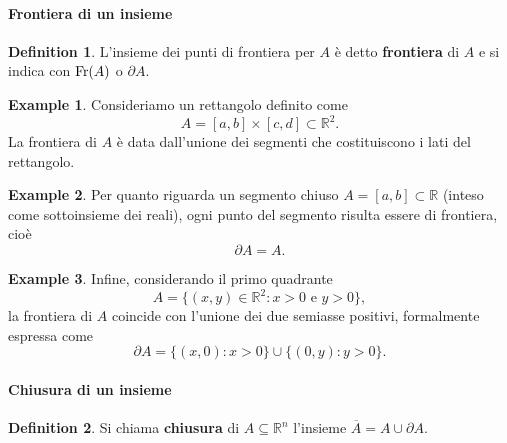 \documentclass{article}
\theoremstyle{plain}
\theoremstyle{definition}
\newtheorem{defn}{Definition}[section]
\newtheorem{exmp}{Example}[section]
\theoremstyle{remark}
\begin{document}
\paragraph{Frontiera di un insieme}
\begin{bxthm}
\begin{defn}
    L'insieme dei punti di frontiera per $A$ è detto \textbf{frontiera} di $A$ e si indica con $\textup{Fr}(A)$ o $\partial A$.
\end{defn}
\end{bxthm}

\vspace{10pt}

\begin{exmp}
    Consideriamo un rettangolo definito come
    \[
    A = [a,b] \times [c,d] \subset \mathbb{R}^2.
    \]
    La frontiera di \( A \) è data dall'unione dei segmenti che costituiscono i lati del rettangolo.
\end{exmp}

\vspace{10pt}

\begin{exmp}
    Per quanto riguarda un segmento chiuso \( A = [a,b] \subset \mathbb{R} \) (inteso come sottoinsieme dei reali), ogni punto del segmento risulta essere di frontiera, cioè
    \[
    \partial A = A.
    \]
\end{exmp}

\vspace{10pt}

\begin{exmp}
    Infine, considerando il primo quadrante
    \[
    A = \{(x,y) \in \mathbb{R}^2 : x>0 \text{ e } y>0\},
    \]
    la frontiera di \( A \) coincide con l'unione dei due semiasse positivi, formalmente espressa come
    \[
    \partial A = \{(x,0) : x > 0\} \cup \{(0,y) : y > 0\}.
    \]
\end{exmp}

\vspace{10pt}

\paragraph{Chiusura di un insieme}
\begin{bxthm}
\begin{defn}
    Si chiama \textbf{chiusura} di $A\subseteq\mathbb{R}^n$ l'insieme $\overline{A}=A\cup\partial A$. 
\end{defn}
\end{bxthm}
\end{document}
